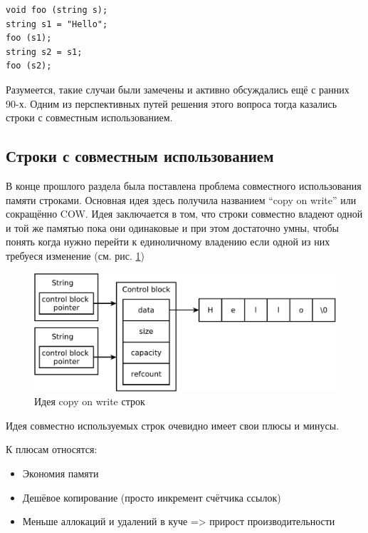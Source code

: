 \documentclass[a4paper,12pt,oneside]{book}
\begin{document}
\begin{lstlisting}
void foo (string s);
string s1 = "Hello";
foo (s1);
string s2 = s1;
foo (s2);
\end{lstlisting}

Разумеется, такие случаи были замечены и активно обсуждались ещё с ранних 90-х. Одним из перспективных путей решения этого вопроса тогда казались строки с совместным использованием.

\subsection{Строки с совместным использованием}\label{subsub:cow}

В конце прошлого раздела была поставлена проблема совместного использования памяти строками. Основная идея здесь получила названием ``copy on write'' или сокращённо COW. Идея заключается в том, что строки совместно владеют одной и той же памятью пока они одинаковые и при этом достаточно умны, чтобы понять когда нужно перейти к единоличному владению если одной из них требуеся изменение (см. рис. \ref{fig:principal-cow})

\begin{figure}[ht]
\centering
\includegraphics[width=1.0\textwidth]{illustrations/cow-principal-crop.pdf}
\caption{Идея copy on write строк}
\label{fig:principal-cow}
\end{figure}

Идея совместно используемых строк очевидно имеет свои плюсы и минусы.

К плюсам относятся:

\begin{itemize}
\item Экономия памяти
\item Дешёвое копирование (просто инкремент счётчика ссылок)
\item Меньше аллокаций и удалений в куче => прирост производительности
\end{itemize}
\end{document}
